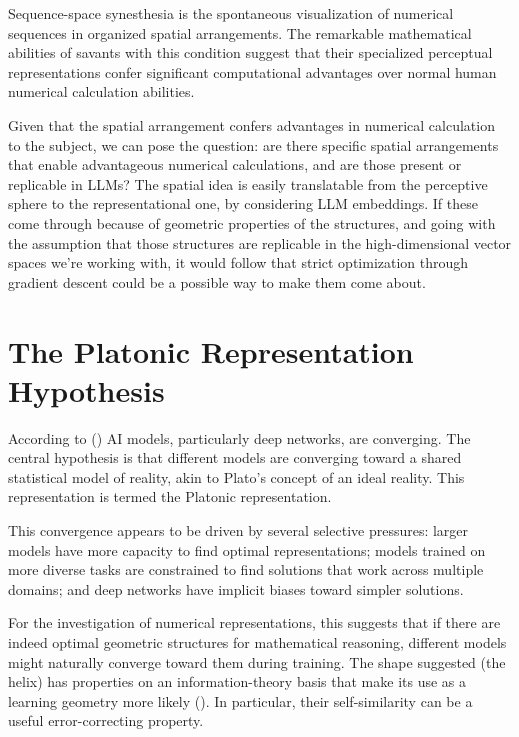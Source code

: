 \documentclass[
  a4paper, twoside, 10pt, titlepage]{book}
\begin{document}
Sequence-space synesthesia is the spontaneous visualization of numerical
sequences in organized spatial arrangements. The remarkable mathematical
abilities of savants with this condition suggest that their specialized
perceptual representations confer significant computational advantages
over normal human numerical calculation abilities.

Given that the spatial arrangement confers advantages in numerical
calculation to the subject, we can pose the question: are there specific
spatial arrangements that enable advantageous numerical calculations,
and are those present or replicable in LLMs? The spatial idea is easily
translatable from the perceptive sphere to the representational one, by
considering LLM embeddings. If these come through because of geometric
properties of the structures, and going with the assumption that those
structures are replicable in the high-dimensional vector spaces we're
working with, it would follow that strict optimization through gradient
descent could be a possible way to make them come about.

\section{The Platonic Representation
Hypothesis}\label{the-platonic-representation-hypothesis}

According to () AI models,
particularly deep networks, are converging. The central hypothesis is
that different models are converging toward a shared statistical model
of reality, akin to Plato's concept of an ideal reality. This
representation is termed the Platonic representation.

This convergence appears to be driven by several selective pressures:
larger models have more capacity to find optimal representations; models
trained on more diverse tasks are constrained to find solutions that
work across multiple domains; and deep networks have implicit biases
toward simpler solutions.

For the investigation of numerical representations, this suggests that
if there are indeed optimal geometric structures for mathematical
reasoning, different models might naturally converge toward them during
training. The shape suggested (the helix) has properties on an
information-theory basis that make its use as a learning geometry more
likely (). In
particular, their self-similarity can be a useful error-correcting
property.
\end{document}
